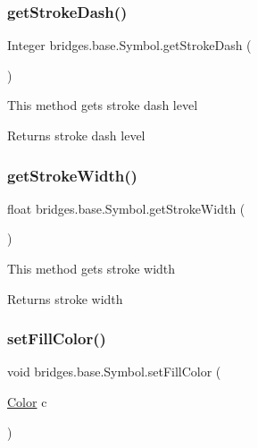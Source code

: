 \subsubsection{\texorpdfstring{get\+Stroke\+Dash()}{getStrokeDash()}}
{\footnotesize\ttfamily Integer bridges.\+base.\+Symbol.\+get\+Stroke\+Dash (\begin{DoxyParamCaption}{ }\end{DoxyParamCaption})}

This method gets stroke dash level

\begin{DoxyReturn}{Returns}
stroke dash level 
\end{DoxyReturn}
\mbox{\label{classbridges_1_1base_1_1_symbol_a9c79f84ba764b7683c99c5deb1f5a191}} 
\subsubsection{\texorpdfstring{get\+Stroke\+Width()}{getStrokeWidth()}}
{\footnotesize\ttfamily float bridges.\+base.\+Symbol.\+get\+Stroke\+Width (\begin{DoxyParamCaption}{ }\end{DoxyParamCaption})}

This method gets stroke width

\begin{DoxyReturn}{Returns}
stroke width 
\end{DoxyReturn}
\mbox{\label{classbridges_1_1base_1_1_symbol_a850688e5157674aee916fef6cd9e0b8c}} 
\subsubsection{\texorpdfstring{set\+Fill\+Color()}{setFillColor()}\hspace{0.1cm}{\footnotesize\ttfamily [1/2]}}
{\footnotesize\ttfamily void bridges.\+base.\+Symbol.\+set\+Fill\+Color (\begin{DoxyParamCaption}\item[{\mbox{\hyperlink{classbridges_1_1base_1_1_color}{Color}}}]{c }\end{DoxyParamCaption})}

